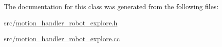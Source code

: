 The documentation for this class was generated from the following files\+:\begin{DoxyCompactItemize}
\item 
src/\mbox{\hyperlink{motion__handler__robot__explore_8h}{motion\+\_\+handler\+\_\+robot\+\_\+explore.\+h}}\item 
src/\mbox{\hyperlink{motion__handler__robot__explore_8cc}{motion\+\_\+handler\+\_\+robot\+\_\+explore.\+cc}}\end{DoxyCompactItemize}

